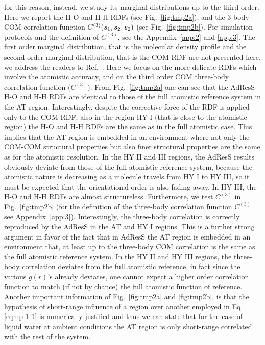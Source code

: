 \documentclass[aip,jcp,a4paper,reprint,onecolumn]{revtex4-1}
\newcommand{\vect}[1]{\textbf{\textit{#1}}}
\newcommand{\corr}{C^{(3)}}
\begin{document}
for this reason, instead, we study its marginal distributions up to the third order.
Here we report the H-O and H-H RDFs (see Fig.~\ref{fig:tmp2a}), and the 3-body COM correlation function
$\corr(\vect s_1, \vect s_2, \vect s_2)$ (see Fig.~\ref{fig:tmp2b}). For simulation
protocols and the definition of $\corr$, see the Appendix~\ref{app:2} and \ref{app:3}.
The first order marginal distribution, that is the molecular density profile and the second order marginal distribution, that is the COM RDF are not presented here, we address the readers to Ref.~. 
Here we focus on the more delicate RDFs which involve the atomistic accuracy, and on the third order COM three-body correlation function ($\corr$). From Fig.~\ref{fig:tmp2a} one can see that
the AdResS H-O and H-H RDFs are identical to those of 
the full atomistic reference system in the AT region.
Interestingly, despite the corrective force of the RDF is applied only to the COM RDF, also in the region HY I (that is close to the atomistic region) the H-O and H-H RDFs are the same as in the full atomistic case.
This implies that the AT region
is embedded in an environment where not only the COM-COM structural properties but also finer structural
properties are the same as for the atomistic resolution.
In the HY II and III regions, the AdResS results obviously deviate from those
of the full atomistic reference system, because the atomistic nature 
is decreasing as a molecule travels from HY I to HY III, so it must be expected 
that the orientational order is also fading away. In HY III, the H-O and H-H
RDFs are almost structureless.
Furthermore, we test $\corr$ in Fig.~\ref{fig:tmp2b} (for the definition of the three-body correlation function $\corr$ see Appendix~\ref{app:3}).
Interestingly, the three-body correlation is correctly reproduced
by the AdResS in the AT and HY I  regions. This is a further strong argument in favor of the fact that in AdResS the AT region is embedded in an environment that, at least up to the three-body COM correlation is the same as the full atomistic reference system.
In the HY II and HY III regions, the three-body correlation deviates from the
full atomistic reference, in fact since the various $g(r)$'s already deviates, one cannot expect a higher order correlation function to match (if not by chance) the full atomistic function of reference.
Another important information of Fig.~\ref{fig:tmp2a} and \ref{fig:tmp2b},
is that the hypothesis of short-range influence of a region over another employed in Eq.\ref{eqn:p-1-1} is numerically justified and thus we can state that for the case of liquid water at ambient conditions the AT region is only short-range
correlated with the rest of the system.
\end{document}

